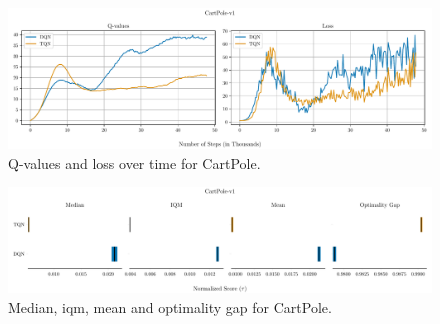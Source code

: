 \begin{figure}[!htbp]
\centering
\includegraphics[width=\textwidth]{images/q-vs-loss_DQN-TQN_CartPole-v1.pdf}
\caption{Q-values and loss over time for CartPole.}
\label{fig:q-vs-loss-CartPole-v1}
\end{figure}

\begin{figure}[!htbp]
\centering
\includegraphics[width=\textwidth]{images/statistics_DQN-TQN_CartPole-v1.pdf}
\caption{Median, \acrshort{iqm}, mean and optimality gap for CartPole.}
\label{fig:statistics-CartPole-v1}
\end{figure}
